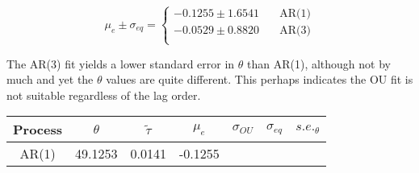 \documentclass{article}
\begin{document}
\[
 \mu_e \pm \sigma_{eq} =
  \begin{cases}
    -0.1255 \pm  1.6541 & \quad \text{AR(1)} \\
    -0.0529 \pm  0.8820  & \quad \text{AR(3)}\\
  \end{cases}
\]

The AR(3) fit yields a lower standard error in \(\theta\) than AR(1),
although not by much and yet the \(\theta\) values are quite different.
This perhaps indicates the OU fit is not suitable regardless of the lag
order.

    \begin{longtable}[c]{@{}ccccccc@{}}
\toprule
\begin{minipage}[b]{0.11\columnwidth}\centering\strut
Process
\strut\end{minipage} &
\begin{minipage}[b]{0.12\columnwidth}\centering\strut
\(\theta\)
\strut\end{minipage} &
\begin{minipage}[b]{0.13\columnwidth}\centering\strut
\(\tilde{\tau}\)
\strut\end{minipage} &
\begin{minipage}[b]{0.11\columnwidth}\centering\strut
\(\mu_e\)
\strut\end{minipage} &
\begin{minipage}[b]{0.12\columnwidth}\centering\strut
\(\sigma_{OU}\)
\strut\end{minipage} &
\begin{minipage}[b]{0.11\columnwidth}\centering\strut
\(\sigma_{eq}\)
\strut\end{minipage} &
\begin{minipage}[b]{0.13\columnwidth}\centering\strut
\(s.e._\theta\)
\strut\end{minipage}\tabularnewline
\midrule
\endhead
\begin{minipage}[t]{0.11\columnwidth}\centering\strut
AR(1)
\strut\end{minipage} &
\begin{minipage}[t]{0.12\columnwidth}\centering\strut
49.1253
\strut\end{minipage} &
\begin{minipage}[t]{0.13\columnwidth}\centering\strut
0.0141
\strut\end{minipage} &
\begin{minipage}[t]{0.11\columnwidth}\centering\strut
-0.1255
\strut\end{minipage} &
\begin{minipage}[t]{0.12\columnwidth}\centering\strut

\end{minipage}
\end{longtable}
\end{document}
